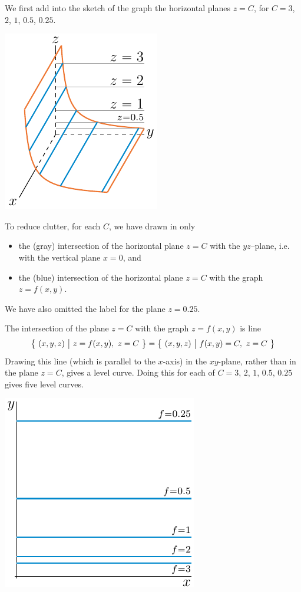 \begin{solution}
We first add into the sketch of the graph the horizontal planes $z=C$,
for $C=3$, $2$, $1$, $0.5$, $0.25$. 
\begin{center}
  \includegraphics{fig/hyperCylinderGraphB.pdf}
\end{center}
To reduce clutter, for each $C$, we have drawn in only 
\begin{itemize}
\item 
the (gray) intersection of the horizontal plane $z=C$ with the $yz$--plane,
i.e. with the vertical plane $x=0$, and
\item
the (blue) intersection of the horizontal plane $z=C$ with the graph $z=f(x,y)$.
\end{itemize} 
We have also omitted the label for the plane $z=0.25$.

The intersection of the plane $z=C$ with the graph $z=f(x,y)$ is line
\begin{equation*}
\big\{ \ (x,y,z)\ \big|\ z=f(x,y),\ z=C\ \big\} =  \big\{ \ (x,y,z)\ \big|\ f(x,y)=C,\ z=C\ \big\}
\end{equation*}
Drawing this line (which is parallel to the $x$-axis) in the $xy$-plane,
rather than in the plane $z=C$, gives a level curve. Doing this for each of
$C=3$, $2$, $1$, $0.5$, $0.25$ gives five level curves. 
\begin{center}
  \includegraphics{fig/hyperCylinderLevel.pdf}
\end{center}

\end{solution}

